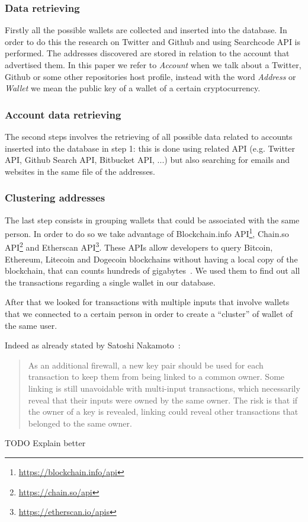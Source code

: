 \subsubsection*{Data retrieving} Firstly all the possible wallets are collected
and inserted into the database. In order to do this the research on
Twitter and Github and using Searchcode API is performed. The addresses
discovered are stored in relation to the account that advertised them.
In this paper we refer to \textit{Account} when we talk about a Twitter, Github
or some other repositories host profile, instead with the word \textit{Address}
or \textit{Wallet} we mean the public key of a wallet of a certain
cryptocurrency.
\subsubsection*{Account data retrieving} The second steps involves the
retrieving of all possible data related to accounts inserted into the database
in step 1: this is done using related API (e.g. Twitter API, Github Search API,
Bitbucket API, ...) but also searching for emails and websites in the same file
of the addresses.
\subsubsection*{Clustering addresses} The last step consists in grouping 
wallets that could be associated with the same person. In order to do so we
take advantage of
Blockchain.info API\footnote{\url{https://blockchain.info/api}},
Chain.so API\footnote{\url{https://chain.so/api}} and
Etherscan API\footnote{\url{https://etherscan.io/apis}}. These APIs allow
developers to query Bitcoin, Ethereum, Litecoin and Dogecoin blockchains without
having a local copy of the blockchain, that can counts hundreds of
gigabytes~\cite{bib:bitinfochart}. We used them to find out all the transactions
regarding a single wallet in our database. 

After that we looked for transactions with multiple inputs that
involve wallets that we connected to a certain person in order to create a
``cluster'' of wallet of the same user. 

Indeed as already stated by Satoshi Nakamoto~\cite{bib:satoshi}:
\begin{quotation}
	As an additional firewall, a new key pair should be used for each
	transaction to keep them from being linked to a common owner.
	Some linking is still unavoidable with multi-input transactions, which
	necessarily reveal that their inputs were owned by the same owner. 
	The risk is that if the owner of a key is revealed, linking could reveal
	other transactions that belonged to
	the same owner.
\end{quotation}



TODO Explain better












